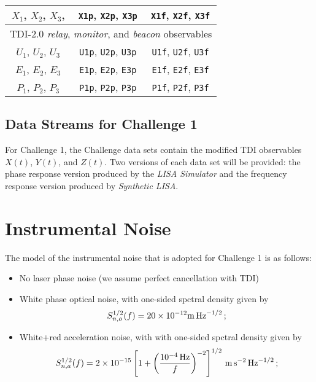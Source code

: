 \documentclass[11pt]{report}
\def\be{\begin{equation}}
\def\ee{\end{equation}}
\begin{document}
\begin{center}
\begin{tabular}{c|c|c}
$X_1$, $X_2$, $X_3$, & \texttt{X1p}, \texttt{X2p}, \texttt{X3p} & \texttt{X1f}, \texttt{X2f}, \texttt{X3f} \\
\hline
\multicolumn{3}{c}{TDI-2.0 \emph{relay}, \emph{monitor}, and \emph{beacon} observables} \\
$U_1$, $U_2$, $U_3$ & \texttt{U1p}, \texttt{U2p}, \texttt{U3p} & \texttt{U1f}, \texttt{U2f}, \texttt{U3f} \\
$E_1$, $E_2$, $E_3$ & \texttt{E1p}, \texttt{E2p}, \texttt{E3p} & \texttt{E1f}, \texttt{E2f}, \texttt{E3f} \\
$P_1$, $P_2$, $P_3$ & \texttt{P1p}, \texttt{P2p}, \texttt{P3p} & \texttt{P1f}, \texttt{P2f}, \texttt{P3f} \\
\hline \hline
\end{tabular}
\end{center}
\subsection{Data Streams for Challenge 1}
For Challenge 1, the Challenge data sets contain the modified TDI observables $X(t)$, $Y(t)$, and $Z(t)$.
Two versions of each data set will be provided: the phase response version produced by the {\it LISA Simulator} and
the  frequency response version produced by {\it Synthetic LISA}.


\section{Instrumental Noise}

The model of the instrumental noise that is adopted for Challenge 1 is as follows:

\begin{itemize}

\item No laser phase noise (we assume perfect cancellation with TDI)

\item White phase optical noise, with one-sided spctral density given by 
\be
S_{n,o}^{1/2}(f) = 20 \times 10^{-12} {\rm m}\, {\rm Hz}^{-1/2}\,;
\label{e:Sno}
\ee

\item White+red acceleration noise, with with one-sided spctral density given by 
\be
S_{n,a}^{1/2}(f) = 2 \times 10^{-15} \left[1 + \left(\frac{10^{-4}\,{\rm Hz}}{f}\right)^{-2}\right]^{1/2}\, {\rm m}\,{\rm s}^{-2}\, {\rm Hz}^{-1/2}\,;
\label{e:Sna}
\ee

\end{itemize}
\end{document}

